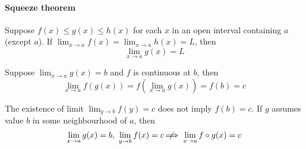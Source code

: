 \paragraph{Squeeze theorem}
	Suppose $f(x) \le g(x) \le h(x)$ for each $x$ in an open interval containing $a$ (except $a$).
	If $\displaystyle \lim_{x \to a} f(x) = \lim_{x \to a} h(x) = L$,  then
	\begin{equation}
		\lim_{x \to a} g(x) = L
		\label{equ:lim_squeeze}
	\end{equation}

\begin{theorem}
	Suppose $\displaystyle \lim_{x \to a} g(x) = b$ and $f$ is continuous at $b$, then
	\begin{equation}
		\lim_{x \to a} f(g(x)) = f(\lim_{x \to a} g(x)) = f(b) = c
	\end{equation}
\end{theorem}

\begin{remark}
	The existence of limit $\displaystyle \lim_{y \to b} f(y) = c$ does not imply $f(b) = c$.
	If $g$ assumes value $b$ in some neighbourhood of $a$, then
	\[ \lim_{x \to a} g(x) = b,\ \lim_{y \to b} f(x) = c \;\not\nobreak\!\!\!\!\implies \lim_{x \to a} f \circ g(x) = c \]
\end{remark}
